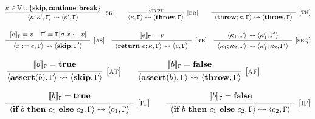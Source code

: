 \begin{figure}[t]
\centering
$$
\infer[{[\rname{sk}]}]{\conf{\kappa;\kappa',\cstate} \leadsto \conf{\kappa',\cstate}}{\kappa \in \mathbb{V} \cup \{\textbf{skip},\textbf{continue},\textbf{break}\}}
~~~~~~
\infer[{[\rname{er}]}]{\conf{\kappa,\cstate} \leadsto \conf{\textbf{throw},\cstate}}{\textit{error}}
~~~~~~
\infer[{[\rname{th}]}]{
	\begin{array}{c}
	\conf{\textbf{throw};\kappa,\cstate}
	\leadsto \conf{\textbf{throw},\cstate}
	\end{array}
	}{}
$$

$$
\infer[{[\rname{as}]}]
{
	\begin{array}{l}
	\conf{x:=e,\cstate} 
	\leadsto \conf{\textbf{skip},\cstate'}
	\end{array}
}{
	\begin{array}{c}
	\eval{e}_{\cstate} = v
	~~~
	\cstate' = \cstate[\lstate.x \leftarrow v]
	\end{array}}
~~~
\infer[{[\rname{re}]}]{
	\begin{array}{c}
		\conf{\textbf{return}~e;\kappa, \cstate}
		\leadsto \conf{v,\cstate}
	\end{array}
}{\eval{e}_\cstate  = v}
~~~
\infer[{[\rname{seq}]}]{
	\begin{array}{c}
		\conf{\kappa_1;\kappa_2,\cstate}
		\leadsto \conf{\kappa'_1;\kappa_2,\cstate'}
	\end{array}
}{\conf{\kappa_1,\cstate} \leadsto \conf{\kappa'_1,\cstate'}}	
$$

$$
\infer[{[\rname{at}]}]{\conf{\textbf{assert}(b),\cstate} \leadsto \conf{\textbf{skip},\cstate}}{
	\begin{array}{c}
	\eval{b}_{\cstate} = \textbf{true}
	\end{array}
}
~~~~~~
\infer[{[\rname{af}]}]{\conf{\textbf{assert}(b),\cstate} \leadsto \conf{\textbf{throw},\cstate}}{
	\begin{array}{c}
	\eval{b}_{\cstate} = \textbf{false}
	\end{array}}
$$

$$
\infer[{[\rname{it}]}]{
	\begin{array}{c}
	\conf{\ifs{b}{c_1}{c_2},\cstate}
	\leadsto \conf{c_1,\cstate}
	\end{array}
}
{
	\begin{array}{c}
	\eval{b}_{\cstate} = \textbf{true}
	\end{array}
}	
~~~~~~
\infer[{[\rname{if}]}]{
	\begin{array}{c}
	\conf{\ifs{b}{c_1}{c_2},\cstate}
	\leadsto \conf{c_2,\cstate}
	\end{array}
}
{
	\begin{array}{c}
	\eval{b}_{\cstate} = \textbf{false}\\
	\end{array}
}	
$$


\end{figure}
